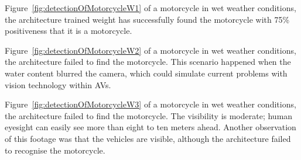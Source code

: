 \documentclass[conference]{IEEEtran}
\begin{document}
	Figure~\ref{fig:detectionOfMotorcycleW1} of a motorcycle in wet weather conditions, the architecture trained weight has successfully found the motorcycle with 75\% positiveness that it is a motorcycle.

	Figure~\ref{fig:detectionOfMotorcycleW2} of a motorcycle in wet weather conditions, the architecture failed to find the motorcycle. This scenario happened when the water content blurred the camera, which could simulate current problems with vision technology within AVs.

	Figure~\ref{fig:detectionOfMotorcycleW3} of a motorcycle in wet weather conditions, the architecture failed to find the motorcycle. The visibility is moderate; human eyesight can easily see more than eight to ten meters ahead. Another observation of this footage was that the vehicles are visible, although the architecture failed to recognise the motorcycle.
\end{document}
